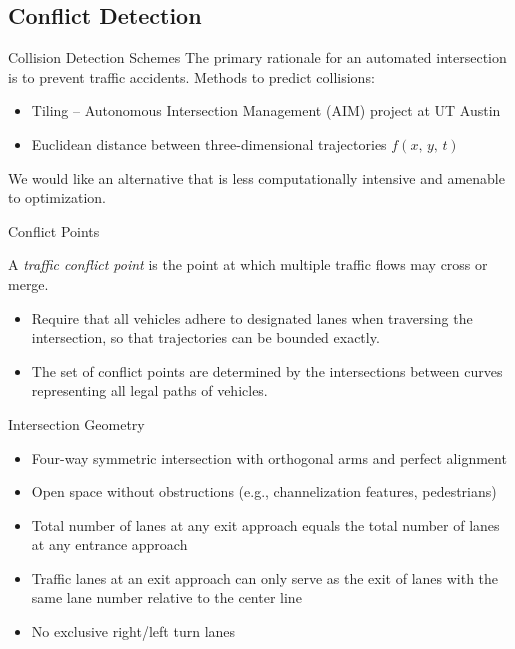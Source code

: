 \subsection{Conflict Detection}

\begin{frame}{Collision Detection Schemes}
The primary rationale for an automated intersection is to prevent traffic accidents.
Methods to predict collisions:
\begin{itemize}
\item Tiling -- Autonomous Intersection Management (AIM) project at UT Austin
\item Euclidean distance between three-dimensional trajectories $f(x,\,y,\,t)$
\end{itemize}
We would like an alternative that is less computationally intensive
and amenable to optimization.
\end{frame}

\begin{frame}{Conflict Points}
\begin{definition}
A \emph{traffic conflict point} is the point at which multiple
	traffic flows may cross or merge.
\end{definition}
\begin{itemize}
\item Require that all vehicles adhere to designated lanes when
	traversing the intersection, so that trajectories can be bounded
	exactly.
\item The set of conflict points are determined by the intersections
	between curves representing all legal paths of vehicles.
\end{itemize}
\end{frame}


\begin{frame}{Intersection Geometry}
\begin{itemize}
\item Four-way symmetric intersection with orthogonal arms and
	perfect alignment
\item Open space without obstructions (e.g., channelization
	features, pedestrians)
\item Total number of lanes at any exit approach equals the
	total number of lanes at any entrance approach
\item Traffic lanes at an exit approach can only serve as the
	exit of lanes with the same lane number relative to
	the center line
\item No exclusive right/left turn lanes
\end{itemize}
\end{frame}

